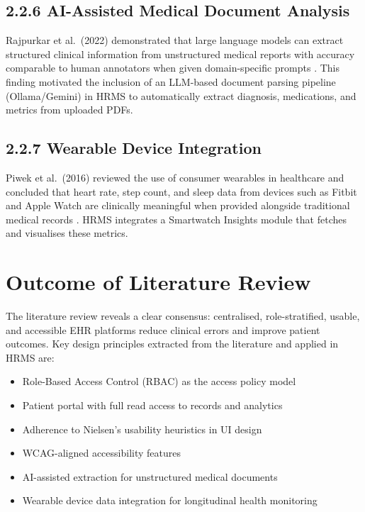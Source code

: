 \documentclass[12pt,a4paper]{report}
\begin{document}
\subsection{2.2.6 AI-Assisted Medical Document Analysis}
Rajpurkar et al.\ (2022) demonstrated that large language models can extract structured clinical information from unstructured medical reports with accuracy comparable to human annotators when given domain-specific prompts \cite{rajpurkar2022}. This finding motivated the inclusion of an LLM-based document parsing pipeline (Ollama/Gemini) in HRMS to automatically extract diagnosis, medications, and metrics from uploaded PDFs.

\subsection{2.2.7 Wearable Device Integration}
Piwek et al.\ (2016) reviewed the use of consumer wearables in healthcare and concluded that heart rate, step count, and sleep data from devices such as Fitbit and Apple Watch are clinically meaningful when provided alongside traditional medical records \cite{piwek2016}. HRMS integrates a Smartwatch Insights module that fetches and visualises these metrics.

\section{Outcome of Literature Review}

The literature review reveals a clear consensus: centralised, role-stratified, usable, and accessible EHR platforms reduce clinical errors and improve patient outcomes. Key design principles extracted from the literature and applied in HRMS are:

\begin{itemize}
    \item Role-Based Access Control (RBAC) as the access policy model
    \item Patient portal with full read access to records and analytics
    \item Adherence to Nielsen's usability heuristics in UI design
    \item WCAG-aligned accessibility features
    \item AI-assisted extraction for unstructured medical documents
    \item Wearable device data integration for longitudinal health monitoring
\end{itemize}
\end{document}
